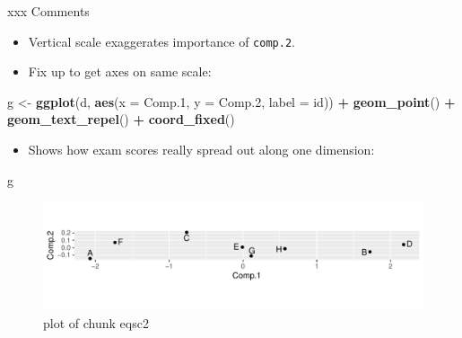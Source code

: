 \documentclass[ignorenonframetext,]{beamer}
\newenvironment{Shaded}{\begin{snugshade}}{\end{snugshade}}
\newcommand{\DataTypeTok}[1]{\textcolor[rgb]{0.13,0.29,0.53}{#1}}
\newcommand{\FloatTok}[1]{\textcolor[rgb]{0.00,0.00,0.81}{#1}}
\newcommand{\KeywordTok}[1]{\textcolor[rgb]{0.13,0.29,0.53}{\textbf{#1}}}
\newcommand{\NormalTok}[1]{#1}
\newcommand{\OperatorTok}[1]{\textcolor[rgb]{0.81,0.36,0.00}{\textbf{#1}}}
\newcommand{\StringTok}[1]{\textcolor[rgb]{0.31,0.60,0.02}{#1}}
\providecommand{\tightlist}{%
  \setlength{\itemsep}{0pt}\setlength{\parskip}{0pt}}
\begin{document}
\begin{frame}[fragile]{xxx Comments}
\protect\hypertarget{xxx-comments}{}

\begin{itemize}
\item
  Vertical scale exaggerates importance of \texttt{comp.2}.
\item
  Fix up to get axes on same scale:
\end{itemize}

\begin{Shaded}
\begin{Highlighting}[]
\NormalTok{g <-}\StringTok{ }\KeywordTok{ggplot}\NormalTok{(d, }\KeywordTok{aes}\NormalTok{(}\DataTypeTok{x =}\NormalTok{ Comp}\FloatTok{.1}\NormalTok{, }\DataTypeTok{y =}\NormalTok{ Comp}\FloatTok{.2}\NormalTok{, }\DataTypeTok{label =}\NormalTok{ id)) }\OperatorTok{+}
\StringTok{  }\KeywordTok{geom_point}\NormalTok{() }\OperatorTok{+}\StringTok{ }\KeywordTok{geom_text_repel}\NormalTok{() }\OperatorTok{+}
\StringTok{  }\KeywordTok{coord_fixed}\NormalTok{()}
\end{Highlighting}
\end{Shaded}

\begin{itemize}
\tightlist
\item
  Shows how exam scores really spread out along one dimension:
\end{itemize}

\begin{Shaded}
\begin{Highlighting}[]
\NormalTok{g}
\end{Highlighting}
\end{Shaded}

\begin{figure}
\centering
\includegraphics{figure/eqsc2-1.pdf}
\caption{plot of chunk eqsc2}
\end{figure}

\end{frame}
\end{document}
